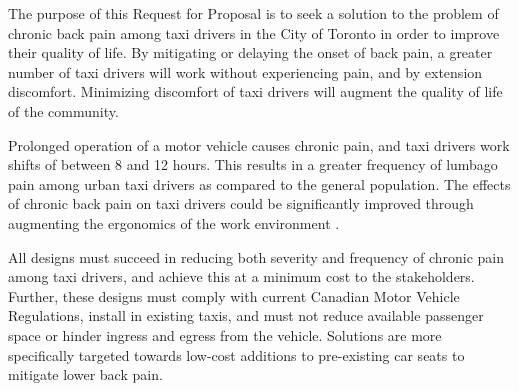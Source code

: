 The purpose of this Request for Proposal is to seek a solution to the
problem of chronic back pain among taxi drivers in the City of Toronto in
order to improve their quality of life. By mitigating or delaying the
onset of back pain, a greater number of taxi drivers will work without 
experiencing pain, and by extension discomfort. Minimizing discomfort of taxi drivers
will augment the quality of life of the community. 

Prolonged operation of a motor vehicle causes chronic pain, and taxi
drivers work shifts of between 8 and 12 hours. This results in a
greater frequency of lumbago pain among urban
taxi drivers as compared to the general population. The effects of chronic back pain
on taxi drivers could be significantly improved through augmenting 
the ergonomics of the work environment \cite{LostWorkdays}.

All designs must succeed in reducing both severity and frequency of
chronic pain among taxi drivers, and achieve this at a minimum cost to
the stakeholders. Further, these designs must comply with current
Canadian Motor Vehicle Regulations, install in existing taxis, and
must not reduce available passenger space or hinder ingress and
egress from the vehicle. Solutions are more specifically targeted
towards low-cost additions to pre-existing car seats to mitigate lower
back pain.
